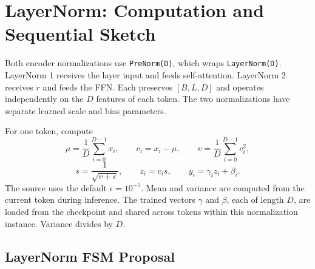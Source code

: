 \documentclass[11pt,a4paper]{article}
\begin{document}
\section{LayerNorm: Computation and Sequential Sketch}

Both encoder normalizations use \texttt{PreNorm(D)}, which wraps
\texttt{LayerNorm(D)}. LayerNorm 1 receives the layer input and feeds
self-attention. LayerNorm 2 receives $r$ and feeds the FFN. Each preserves
$[B,L,D]$ and operates independently on the $D$ features of each token.
The two normalizations have separate learned scale and bias parameters.

For one token, compute
\[
\mu=\frac{1}{D}\sum_{i=0}^{D-1}x_i,\qquad
c_i=x_i-\mu,\qquad
v=\frac{1}{D}\sum_{i=0}^{D-1}c_i^2,
\]
\[
s=\frac{1}{\sqrt{v+\epsilon}},\qquad
z_i=c_i s,\qquad y_i=\gamma_i z_i+\beta_i.
\]
The source uses the default $\epsilon=10^{-5}$. Mean and variance are computed
from the current token during inference. The trained vectors $\gamma$ and
$\beta$, each of length $D$, are loaded from the checkpoint and shared across
tokens within this normalization instance. Variance divides by $D$.

\begin{center}
\end{center}

\subsection{LayerNorm FSM Proposal}
\end{document}
